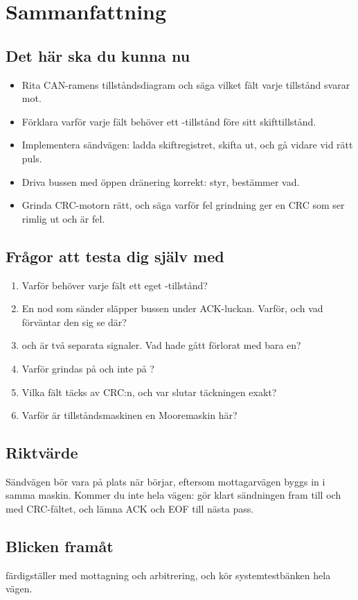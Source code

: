 
\section{Sammanfattning}
\label{c16:sec:review}

\subsection*{Det här ska du kunna nu}
\begin{itemize}
  \item Rita CAN-ramens tillståndsdiagram och säga vilket fält varje tillstånd svarar mot.
  \item Förklara varför varje fält behöver ett -tillstånd före sitt skifttillstånd.
  \item Implementera sändvägen: ladda skiftregistret, skifta ut, och gå vidare vid rätt puls.
  \item Driva bussen med öppen dränering korrekt:  styr,  bestämmer vad.
  \item Grinda CRC-motorn rätt, och säga varför fel grindning ger en CRC som ser rimlig ut och är
    fel.
\end{itemize}

\subsection*{Frågor att testa dig själv med}
\begin{enumerate}
  \item Varför behöver varje fält ett eget -tillstånd?
  \item En nod som sänder släpper bussen under ACK-luckan. Varför, och vad förväntar den sig se där?
  \item {} och  är två separata signaler. Vad hade gått förlorat med bara
    en?
  \item Varför grindas  på  och inte på ?
  \item Vilka fält täcks av CRC:n, och var slutar täckningen exakt?
  \item Varför är tillståndsmaskinen en Mooremaskin här?
\end{enumerate}

\subsection*{Riktvärde}
Sändvägen bör vara på plats när  börjar, eftersom mottagarvägen byggs in i samma
maskin. Kommer du inte hela vägen: gör klart sändningen fram till och med CRC-fältet, och lämna ACK
och EOF till nästa pass.

\subsection*{Blicken framåt}
 färdigställer  med mottagning och arbitrering, och kör
systemtestbänken hela vägen.
